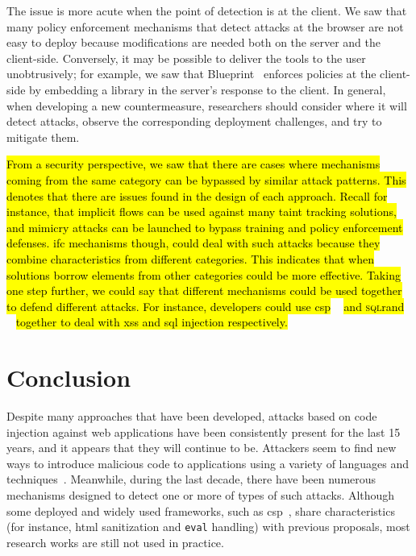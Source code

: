 \documentclass[10pt,journal,compsoc]{IEEEtran}
\newcommand{\hlc}[2][yellow]{ {\sethlcolor{#1} \hl{#2}} }
\begin{document}
The issue is more acute when the point of detection is at the client.
We saw that many policy enforcement mechanisms that detect attacks at
the browser are not easy to deploy because modifications are needed
both on the server and the client-side.
Conversely, it may be possible to deliver
the tools to the user unobtrusively; for example, we saw that
Blueprint~\cite{LV09} enforces policies at the client-side by embedding a library
in the server's response to the client. In general, when developing a
new countermeasure, researchers should consider where it
will detect attacks, observe the corresponding deployment
challenges, and try to mitigate them.

\hlc[yellow]{From a security perspective,
we saw that there are cases where
mechanisms coming from the same category
can be bypassed by similar attack patterns.
This denotes that there are issues
found in the design of each approach.
Recall for instance,
that implicit flows can be used against
many taint tracking solutions,
and mimicry attacks can be launched
to bypass training and policy enforcement defenses.
{\sc ifc} mechanisms though,
could deal with such attacks because they
combine characteristics from different categories.
This indicates that when solutions
borrow elements from other categories
could be more effective.
Taking one step further,
we could say that different mechanisms could
be used together to defend different attacks.
For instance,
developers could use {\sc csp}}~\cite{SSM10}
\hlc[yellow]{and \textsc{sql}rand}~\cite{BK04}
\hlc[yellow]{ together
to deal with {\sc xss} and {\sc sql} injection
respectively.}

\section{Conclusion}
\label{sec:conclusion}

Despite many approaches that have been developed,
attacks based on code injection against web applications
have been consistently present for the last 15 years,
and it appears that they will continue to be.
Attackers seem to find new ways to introduce
malicious code to applications using a
variety of languages and techniques~\cite{HNSHS12,DKH14}.
Meanwhile, during the last decade, there have been
numerous mechanisms designed to
detect one or more of types of such attacks.
Although some deployed and widely used frameworks, 
such as {\sc csp}~\cite{SSM10},
share characteristics
(for instance, {\sc html} sanitization and {\tt eval} handling)
with previous proposals, 
most research works are still not used in practice.
\end{document}
